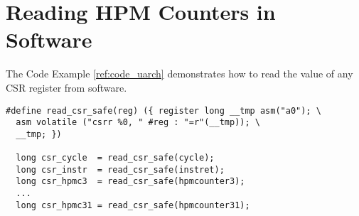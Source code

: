 \section{Reading HPM Counters in Software}

The Code Example \ref{ref:code_uarch} demonstrates how to read the value of any CSR register from software.
  
  
\begin{center}
\begin{minipage}{0.66\textwidth}
\begin{lstlisting}[caption=Reading a CSR register.]
#define read_csr_safe(reg) ({ register long __tmp asm("a0"); \   
  asm volatile ("csrr %0, " #reg : "=r"(__tmp)); \               
  __tmp; })             
  
  long csr_cycle  = read_csr_safe(cycle);
  long csr_instr  = read_csr_safe(instret);
  long csr_hpmc3  = read_csr_safe(hpmcounter3);
  ...
  long csr_hpmc31 = read_csr_safe(hpmcounter31);
  
\end{lstlisting}\label{ref:code_uarch}
\end{minipage}
\end{center}


